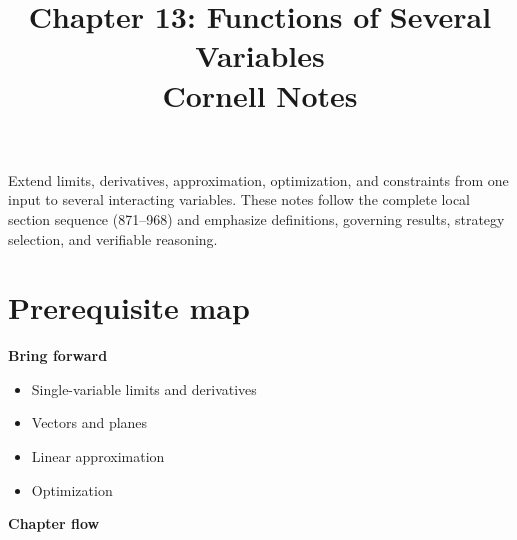 \documentclass[11pt]{article}
\title{Chapter 13: Functions of Several Variables\\[2mm]\large Cornell Notes}
\author{}
\date{}
\begin{document}
\maketitle
\thispagestyle{fancy}
\begin{orientationbox}
Extend limits, derivatives, approximation, optimization, and constraints from one input to several interacting variables. These notes follow the complete local section sequence (871--968) and emphasize definitions, governing results, strategy selection, and verifiable reasoning.
\end{orientationbox}

\section{Prerequisite map}
\begin{minipage}[t]{0.42\textwidth}
\textbf{Bring forward}
\begin{itemize}
\item Single-variable limits and derivatives
\item Vectors and planes
\item Linear approximation
\item Optimization
\end{itemize}
\end{minipage}\hfill
\begin{minipage}[t]{0.54\textwidth}
\textbf{Chapter flow}
\begin{center}
\end{center}
\end{minipage}
\end{document}
